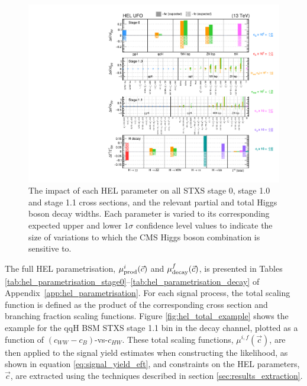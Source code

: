 \begin{figure}[htb!]
  \centering
  \hspace*{-1.4cm}
  \includegraphics[width=1.2\textwidth]{Figures/eft/scaling_functions/HEL_summary.pdf}
  \hspace*{-1.4cm}
  \caption[HEL summary]
  {
    The impact of each HEL parameter on all STXS stage 0, stage 1.0 and stage 1.1 cross sections, and the relevant partial and total Higgs boson decay widths. Each parameter is varied to its corresponding expected upper and lower $1\sigma$ confidence level values to indicate the size of variations to which the CMS Higgs boson combination is sensitive to.
  }
  \label{fig:hel_summary}
\end{figure}

The full HEL parametrisation, $\mu_{\rm{prod}}^i(\vec{c})$ and $\mu_{\rm{decay}}^f(\vec{c})$, is presented in Tables \ref{tab:hel_parametrisation_stage0}--\ref{tab:hel_parametrisation_decay} of Appendix~\ref{app:hel_parametrisation}. For each signal process, the total scaling function is defined as the product of the corresponding cross section and branching fraction scaling functions. Figure \ref{fig:hel_total_example} shows the example for the qqH BSM STXS stage 1.1 bin in the \Hfl decay channel, plotted as a function of $(c_{WW}-c_B)$-vs-$c_{HW}$. These total scaling functions, $\mu^{i,f}(\vec{c})$, are then applied to the signal yield estimates when constructing the likelihood, as shown in equation \ref{eq:signal_yield_eft}, and constraints on the HEL parameters, $\vec{c}$, are extracted using the techniques described in section \ref{sec:results_extraction}.

